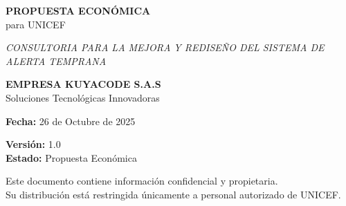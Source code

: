 \begin{titlepage}
    \centering
    
    
    \vspace{2cm}
    
    {\Huge\bfseries PROPUESTA ECONÓMICA\\[0.5cm]}
    {\Large para UNICEF\\[2cm]}
    
    {\large\textit{CONSULTORIA PARA LA MEJORA Y REDISEÑO DEL SISTEMA DE ALERTA TEMPRANA\\[3cm]}}
    
    {\Large\bfseries EMPRESA KUYACODE S.A.S\\[0.5cm]}
    {\large Soluciones Tecnológicas Innovadoras\\[2cm]}
    
    {\large\textbf{Fecha:} 26 de Octubre de 2025\\[1cm]}
    
    {\normalsize
    \textbf{Versión:} 1.0\\[0.3cm]
    \textbf{Estado:} Propuesta Económica\\
    }
    
    \vfill
    
    {\footnotesize
    Este documento contiene información confidencial y propietaria.\\
    Su distribución está restringida únicamente a personal autorizado de UNICEF.
    }
    
\end{titlepage}

\newpage